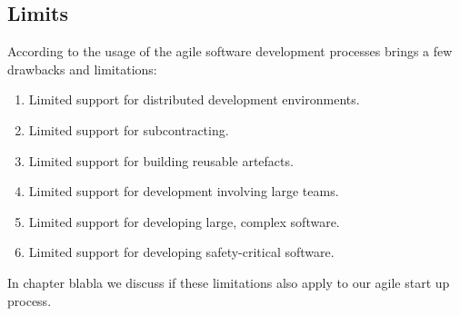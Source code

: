 \subsection{Limits}
According to \cite{turk2002limitations} the usage of the agile software development processes brings a few drawbacks and limitations:
\begin{enumerate}
\item Limited support for distributed development environments.
\item Limited support for subcontracting.
\item Limited support for building reusable artefacts.
\item Limited support for development involving large teams.
\item Limited support for developing large, complex software.
\item Limited support for developing safety-critical software.
\end{enumerate}
In chapter blabla we discuss if these limitations also apply to our agile start up process.

\cite{scrum_linda}